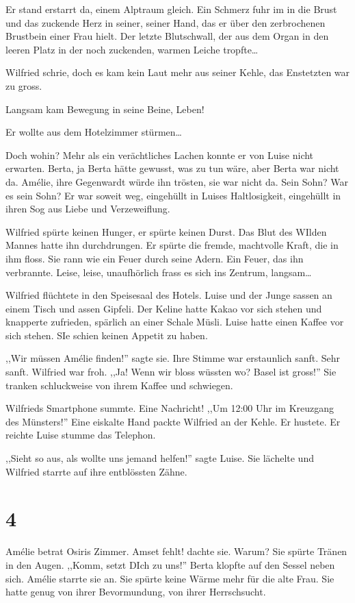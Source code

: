 Er stand erstarrt da, einem Alptraum gleich. Ein Schmerz fuhr im in die Brust und das zuckende Herz in seiner, seiner Hand, das er über den zerbrochenen Brustbein einer Frau hielt. Der letzte Blutschwall, der aus dem Organ in den leeren Platz in der noch zuckenden, warmen Leiche tropfte\dots

Wilfried schrie, doch es kam kein Laut mehr aus seiner Kehle, das Enstetzten war zu gross.

Langsam kam Bewegung in seine Beine, Leben!

Er wollte aus dem Hotelzimmer stürmen\dots

Doch wohin? Mehr als ein verächtliches Lachen konnte er von Luise nicht erwarten. Berta, ja Berta hätte gewusst, was zu tun wäre, aber Berta war nicht da. Amélie, ihre Gegenwardt würde ihn trösten, sie war nicht da. Sein Sohn? War es sein Sohn? Er war soweit weg, eingehüllt in Luises Haltlosigkeit, eingehüllt in ihren Sog aus Liebe und Verzeweiflung.

Wilfried spürte keinen Hunger, er spürte keinen Durst. Das Blut des WIlden Mannes hatte ihn durchdrungen. Er spürte die fremde, machtvolle Kraft, die in ihm floss. Sie rann wie ein Feuer durch seine Adern. Ein Feuer, das ihn verbrannte. Leise, leise, unaufhörlich frass es sich ins Zentrum, langsam\dots

Wilfried flüchtete in den Speisesaal des Hotels. Luise und der Junge sassen an einem Tisch und assen Gipfeli. Der Keline hatte Kakao vor sich stehen und knapperte zufrieden, spärlich an einer Schale Müsli. Luise hatte einen Kaffee vor sich stehen. SIe schien keinen Appetit zu haben.

,,Wir müssen Amélie finden!'' sagte sie. Ihre Stimme war erstaunlich sanft. Sehr sanft. Wilfried war froh. ,,Ja! Wenn wir bloss wüssten wo? Basel ist gross!'' Sie tranken schluckweise von ihrem Kaffee und schwiegen.

Wilfrieds Smartphone summte. Eine Nachricht! ,,Um 12:00 Uhr im Kreuzgang des Münsters!'' Eine eiskalte Hand packte Wilfried an der Kehle. Er hustete. Er reichte Luise stumme das Telephon. 

,,Sieht so aus, als wollte uns jemand helfen!'' sagte Luise. Sie lächelte und Wilfried starrte auf ihre entblössten Zähne.


\section*{4}

Amélie betrat Osiris Zimmer. Amset fehlt! dachte sie. Warum? Sie spürte Tränen in den Augen. ,,Komm, setzt DIch zu uns!'' Berta klopfte auf den Sessel neben sich. Amélie starrte sie an. Sie spürte keine Wärme mehr für die alte Frau. Sie hatte genug von ihrer Bevormundung, von ihrer Herrschsucht. 

